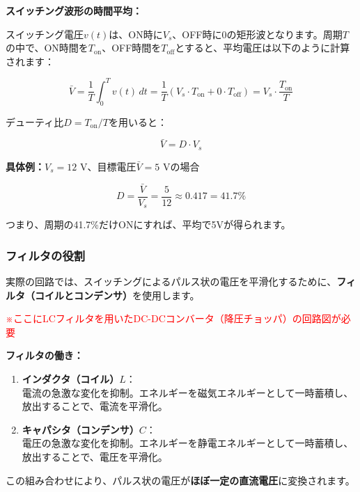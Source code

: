 \begin{screen}
\textbf{スイッチング波形の時間平均：}

スイッチング電圧$v(t)$は、ON時に$V_s$、OFF時に0の矩形波となります。周期$T$の中で、ON時間を$T_{\text{on}}$、OFF時間を$T_{\text{off}}$とすると、平均電圧は以下のように計算されます：

\begin{equation}
\bar{V} = \frac{1}{T} \int_0^T v(t) \, dt = \frac{1}{T} (V_s \cdot T_{\text{on}} + 0 \cdot T_{\text{off}}) = V_s \cdot \frac{T_{\text{on}}}{T}
\end{equation}

デューティ比$D = T_{\text{on}}/T$を用いると：

\begin{equation}
\boxed{\bar{V} = D \cdot V_s}
\end{equation}

\textbf{具体例：}$V_s = 12$ V、目標電圧$\bar{V} = 5$ Vの場合

\begin{equation}
D = \frac{\bar{V}}{V_s} = \frac{5}{12} \approx 0.417 = 41.7\%
\end{equation}

つまり、周期の41.7\%だけONにすれば、平均で5Vが得られます。
\end{screen}

\subsubsection{フィルタの役割}

実際の回路では、スイッチングによるパルス状の電圧を平滑化するために、\textbf{フィルタ（コイルとコンデンサ）}を使用します。

\textcolor{red}{※ここにLCフィルタを用いたDC-DCコンバータ（降圧チョッパ）の回路図が必要}

\begin{screen}
\textbf{フィルタの働き：}

\begin{enumerate}
\item \textbf{インダクタ（コイル）$L$}：\\
電流の急激な変化を抑制。エネルギーを磁気エネルギーとして一時蓄積し、放出することで、電流を平滑化。

\item \textbf{キャパシタ（コンデンサ）$C$}：\\
電圧の急激な変化を抑制。エネルギーを静電エネルギーとして一時蓄積し、放出することで、電圧を平滑化。
\end{enumerate}

この組み合わせにより、パルス状の電圧が\textbf{ほぼ一定の直流電圧}に変換されます。
\end{screen}

